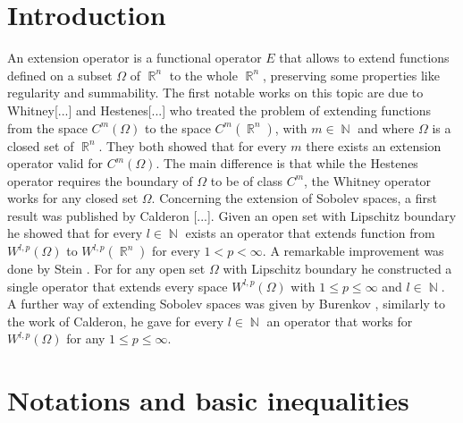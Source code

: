 \documentclass[12pt]{article}
\theoremstyle{definition}
\DeclareMathOperator\rr{\mathbb{R}}
\DeclareMathOperator\nn{\mathbb{N}}
\begin{document}
\section{Introduction}
An extension operator is a functional operator $E$ that allows to extend functions defined on a subset $\Omega$ of $\rr^n$ to the whole $\rr^n$, preserving some properties like regularity and summability. The first notable works on this topic are due to Whitney[...] and Hestenes[...] who treated the problem of extending functions from the space $C^m(\Omega)$ to the space $C^m(\rr^n)$, with $m\in\nn $ and where $\Omega$ is a closed set of $\rr^n$. They both showed that for every $m$ there exists an extension operator valid for $C^m(\Omega)$. The main difference is that while the Hestenes operator requires the boundary of $\Omega$ to be of class $C^m$, the Whitney operator works for any closed set $\Omega.$ Concerning the extension of Sobolev spaces, a first result was published by Calderon [...]. Given an open set with Lipschitz boundary he showed that for every $l \in \nn$ exists an operator that extends function from $W^{l,p}(\Omega)$ to $W^{l,p}(\rr^n)$ for every $1<p<\infty$. A remarkable improvement was done by Stein \cite{stein}. For for any open set $\Omega$ with Lipschitz boundary he constructed a single operator that extends every space $W^{l,p}(\Omega)$ with $1\le p\le \infty$ and $l \in \nn.$ A further way of extending Sobolev spaces was given by Burenkov \cite{burenkov}, similarly to the work of Calderon, he gave for every $l\in \nn$ an operator that works for $W^{l,p}(\Omega)$ for any $1\le p\le \infty$.

\section{Notations and basic inequalities}
\end{document}
